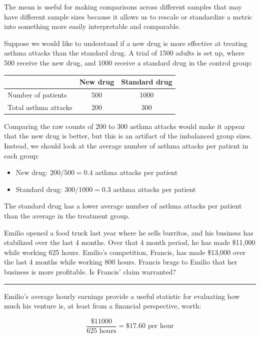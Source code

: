 \documentclass[
  10pt,
  openany]{book}
\providecommand{\tightlist}{%
  \setlength{\itemsep}{0pt}\setlength{\parskip}{0pt}}
\theoremstyle{definition}
\theoremstyle{definition}
\theoremstyle{definition}
\theoremstyle{definition}
\theoremstyle{remark}
\begin{document}
The mean is useful for making comparisons across different samples that may have different sample sizes because it allows us to rescale or standardize a metric into something more easily interpretable and comparable.

Suppose we would like to understand if a new drug is more effective at treating asthma attacks than the standard drug.
A trial of 1500 adults is set up, where 500 receive the new drug, and 1000 receive a standard drug in the control group:

\begin{tabular}{l|c|c}
\hline
 & New drug & Standard drug\\
\hline
Number of patients & 500 & 1000\\
\hline
Total asthma attacks & 200 & 300\\
\hline
\end{tabular}

Comparing the raw counts of 200 to 300 asthma attacks would make it appear that the new drug is better, but this is an artifact of the imbalanced group sizes.
Instead, we should look at the average number of asthma attacks per patient in each group:

\begin{itemize}
\tightlist
\item
  New drug: \(200 / 500 = 0.4\) asthma attacks per patient
\item
  Standard drug: \(300 / 1000 = 0.3\) asthma attacks per patient
\end{itemize}

The standard drug has a lower average number of asthma attacks per patient than the average in the treatment group.

Emilio opened a food truck last year where he sells burritos, and his business has stabilized over the last 4 months.
Over that 4 month period, he has made \$11,000 while working 625 hours.
Emilio's competition, Francis, has made \$13,000 over the last 4 months while working 800 hours. Francis brags to Emilio that her business is more profitable. Is Francis' claim warranted?

\begin{center}\rule{0.5\linewidth}{0.5pt}\end{center}

Emilio's average hourly earnings provide a useful statistic for evaluating how much his venture is, at least from a financial perspective, worth:

\[ \frac{\$11000}{625\text{ hours}} = \$17.60\text{ per hour} \]
\end{document}
